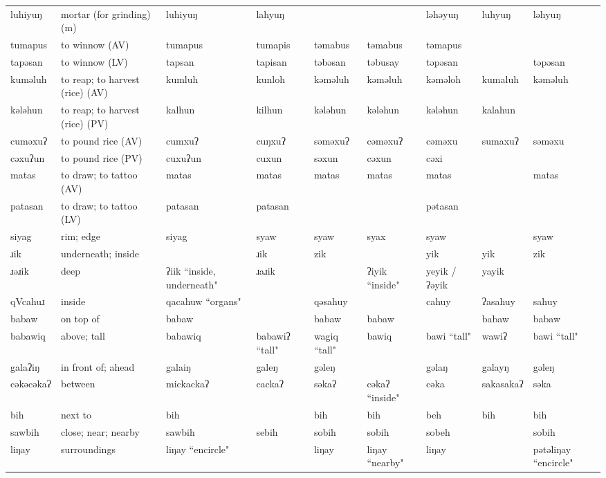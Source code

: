\begin{landscape}
\begin{longtable}{*{9}{>{\raggedright\arraybackslash}p{}}}
\text{*}luhiyuŋ & mortar (for grinding) (m) & luhiyuŋ & lahyuŋ &  &  & ləhəyuŋ & luhyuŋ & ləhyuŋ\\
\text{*}tumapus & to winnow (AV) & tumapus & tumapis & təmabus & təmabus & təmapus &  & \\
\text{*}tapəsan & to winnow (LV) & tapsan & tapisan & təbəsan & təbusay & təpəsan &  & təpəsan\\
\text{*}kuməluh & to reap; to harvest (rice) (AV) & kumluh & kunloh & kəməluh & kəməluh & kəməloh & kumaluh & kəməluh\\
\text{*}kələhun & to reap; to harvest (rice) (PV) & kalhun & kilhun & kələhun & kələhun & kələhun & kalahun & \\
\text{*}cuməxuʔ & to pound rice (AV) & cumxuʔ & cuŋxuʔ & səməxuʔ & cəməxuʔ & cəməxu & sumaxuʔ & səməxu\\
\text{*}cəxuʔun & to pound rice (PV) & cuxuʔun & cuxun & səxun & cəxun & cəxi &  & \\
\text{*}matas & to draw; to tattoo (AV) & matas & matas & matas & matas & matas &  & matas\\
\text{*}patasan & to draw; to tattoo (LV) & patasan & patasan &  &  & pətasan &  & \\
\text{*}siyag & rim; edge & siyag & syaw & syaw & syax & syaw &  & syaw\\
\text{*}ɹik & underneath; inside &  & ɹik & zik &  & yik & yik & zik\\
\text{*}ɹəɹik & deep & ʔiik ``inside, underneath" & ɹaɹik &  & ʔiyik ``inside" & yeyik / ʔəyik & yayik & \\
\text{*}qVcahuɹ & inside & qacahuw \newline ``organs" &  & qəsahuy &  & cahuy & ʔasahuy & sahuy\\
\text{*}babaw & on top of & babaw &  & babaw & babaw &  & babaw & babaw\\
\text{*}babawiq & above; tall & babawiq & babawiʔ ``tall" & wagiq ``tall" & bawiq & bawi ``tall" & wawiʔ & bawi ``tall"\\
\text{*}galaʔiŋ & in front of; ahead & galaiŋ & galeŋ & gəleŋ &  & gəlaŋ & galayŋ & gəleŋ\\
\text{*}cəkəcəkaʔ & between & mickackaʔ & cackaʔ & səkaʔ & cəkaʔ ``inside" & cəka & sakasakaʔ & səka\\
\text{*}bih & next to & bih &  & bih & bih & beh & bih & bih\\
\text{*}sawbih & close; near; nearby & sawbih & sebih & sobih & sobih & sobeh &  & sobih\\
\text{*}liŋay & surroundings & liŋay \newline ``encircle" &  & liŋay & liŋay ``nearby" & liŋay &  & pətəliŋay \newline ``encircle"\\

\end{longtable}
\end{landscape}
